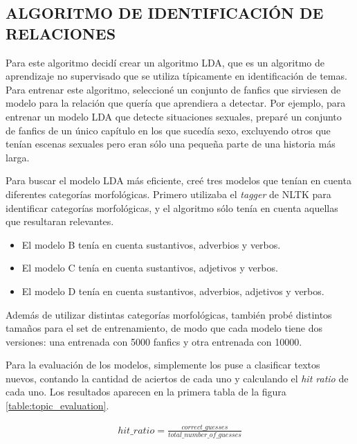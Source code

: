 \documentclass{pre-tfg}
\begin{document}


\subsection{ALGORITMO DE IDENTIFICACIÓN DE RELACIONES}

Para este algoritmo decidí crear un algoritmo LDA, que es un algoritmo de aprendizaje no supervisado que se utiliza típicamente en identificación de temas. Para entrenar este algoritmo, seleccioné un conjunto de fanfics que sirviesen de modelo para la relación que quería que aprendiera a detectar. Por ejemplo, para entrenar un modelo LDA que detecte situaciones sexuales, preparé un conjunto de fanfics de un único capítulo en los que sucedía sexo, excluyendo otros que tenían escenas sexuales pero eran sólo una pequeña parte de una historia más larga. 

Para buscar el modelo LDA más eficiente, creé tres modelos que tenían en cuenta diferentes categorías morfológicas. Primero utilizaba el \textit{tagger} de NLTK para identificar categorías morfológicas, y el algoritmo sólo tenía en cuenta aquellas que resultaran relevantes.

\begin{itemize}
	\item El modelo B tenía en cuenta sustantivos, adverbios y verbos.
	\item El modelo C tenía en cuenta sustantivos, adjetivos y verbos.
	\item El modelo D tenía en cuenta sustantivos, adverbios, adjetivos y verbos.
\end{itemize}

Además de utilizar distintas categorías morfológicas, también probé distintos tamaños para el set de entrenamiento, de modo que cada modelo tiene dos versiones: una entrenada con 5000 fanfics y otra entrenada con 10000.

Para la evaluación de los modelos, simplemente los puse a clasificar textos nuevos, contando la cantidad de aciertos de cada uno y calculando el \textit{hit ratio} de cada uno. Los resultados aparecen en la primera tabla de la figura \ref{table:topic_evaluation}.

\begin{gather*}
hit\_ratio = \frac{correct\_guesses}{total\_number\_of\_guesses}
\end{gather*}
\end{document}
